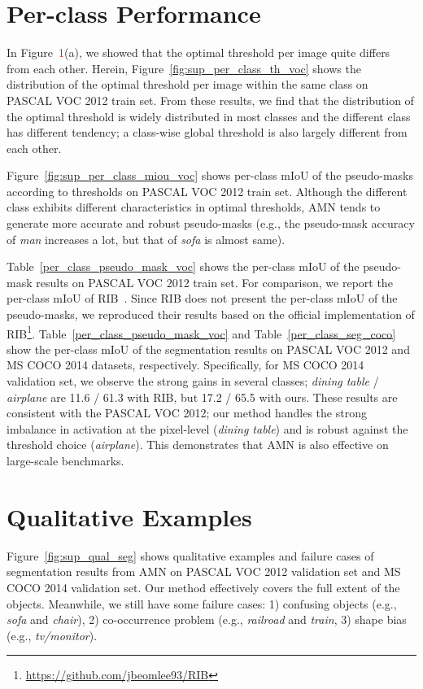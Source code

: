 \documentclass[10pt,twocolumn,letterpaper]{article}
\begin{document}
\section{Per-class Performance}
In Figure~\textcolor{red}{1}(a), we showed that the optimal threshold per image quite differs from each other. Herein, Figure~\ref{fig:sup_per_class_th_voc} shows the distribution of the optimal threshold per image within the same class on PASCAL VOC 2012 train set. From these results, we find that the distribution of the optimal threshold is widely distributed in most classes and the different class has different tendency; a class-wise global threshold is also largely different from each other. 

Figure~\ref{fig:sup_per_class_miou_voc} shows per-class mIoU of the pseudo-masks according to thresholds on PASCAL VOC 2012 train set. Although the different class exhibits different characteristics in optimal thresholds, AMN tends to generate more accurate and robust pseudo-masks (e.g., the pseudo-mask accuracy of \textit{man} increases a lot, but that of \textit{sofa} is almost same).

Table~\ref{per_class_pseudo_mask_voc} shows the per-class mIoU of the pseudo-mask results on PASCAL VOC 2012 train set. For comparison, we report the per-class mIoU of RIB~\cite{lee2021reducing}. Since RIB does not present the per-class mIoU of the pseudo-masks, we reproduced their results based on the official implementation of RIB\footnote{\url{https://github.com/jbeomlee93/RIB}}. Table~\ref{per_class_pseudo_mask_voc} and Table~\ref{per_class_seg_coco} show the per-class mIoU of the segmentation results on PASCAL VOC 2012 and MS COCO 2014 datasets, respectively. Specifically, for MS COCO 2014 validation set, we observe the strong gains in several classes; \textit{dining table} / \textit{airplane} are 11.6 / 61.3 with RIB, but 17.2 / 65.5 with ours. These results are consistent with the PASCAL VOC 2012; our method handles the strong imbalance in activation at the pixel-level (\textit{dining table}) and is robust against the threshold choice (\textit{airplane}). This demonstrates that AMN is also effective on large-scale benchmarks.

\section{Qualitative Examples}
Figure~\ref{fig:sup_qual_seg} shows qualitative examples and failure cases of segmentation results from AMN on PASCAL VOC 2012 validation set and MS COCO 2014 validation set. Our method effectively covers the full extent of the objects. Meanwhile, we still have some failure cases: 1) confusing objects (e.g., \textit{sofa} and \textit{chair}), 2) co-occurrence problem (e.g., \textit{railroad} and \textit{train}, 3) shape bias (e.g., \textit{tv/monitor}).
\end{document}
